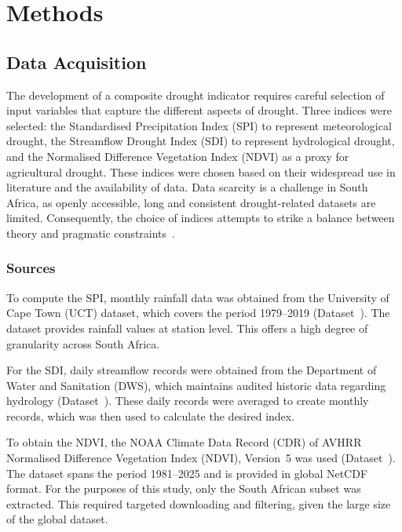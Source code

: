 \graphicspath{{methods/fig/}}

\chapter{Methods}
\label{chap:methods}
\section{Data Acquisition}
The development of a composite drought indicator requires careful selection of input variables that capture the different aspects of drought. Three indices were selected: the Standardised Precipitation Index (SPI) to represent meteorological drought, the Streamflow Drought Index (SDI) to represent hydrological drought, and the Normalised Difference Vegetation Index (NDVI) as a proxy for agricultural drought. These indices were chosen based on their widespread use in literature and the availability of data. Data scarcity is a challenge in South Africa, as openly accessible, long and consistent drought-related datasets are limited. Consequently, the choice of indices attempts to strike a balance between theory and pragmatic constraints~\cite{za_drought_review,za_drought_review2,dnbc_drought_first,dnbc_drought_second}.

\subsection{Sources}
To compute the SPI, monthly rainfall data was obtained from the University of Cape Town (UCT) dataset, which covers the period 1979–2019 (Dataset~\cite{uct_data}). The dataset provides rainfall values at station level. This offers a high degree of granularity across South Africa.

For the SDI, daily streamflow records were obtained from the Department of Water and Sanitation (DWS), which maintains audited historic data regarding hydrology (Dataset~\cite{DWS_2011}). These daily records were averaged to create monthly records, which was then used to calculate the desired index.

To obtain the NDVI, the NOAA Climate Data Record (CDR) of AVHRR Normalised Difference Vegetation Index (NDVI), Version~5 was used (Dataset~\cite{ndvi_data}). The dataset spans the period 1981–2025 and is provided in global NetCDF format. For the purposes of this study, only the South African subset was extracted. This required targeted downloading and filtering, given the large size of the global dataset.

